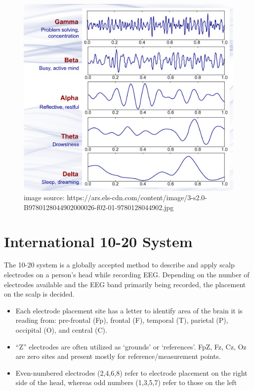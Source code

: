 \documentclass[
  letterpaper,
  DIV=11,
  numbers=noendperiod]{scrreprt}
\begin{document}
\begin{figure}[H]

{\centering \includegraphics[width=1\textwidth,height=\textheight]{images/3-s2.0-B9780128044902000026-f02-01-9780128044902.jpg}

}

\caption{image source:
https://ars.els-cdn.com/content/image/3-s2.0-B9780128044902000026-f02-01-9780128044902.jpg}

\end{figure}%

\section{International 10-20 System}\label{international-10-20-system}

The 10-20 system is a globally accepted method to describe and apply
scalp electrodes on a person's head while recording EEG. Depending on
the number of electrodes available and the EEG band primarily being
recorded, the placement on the scalp is decided.

\begin{itemize}
\item
  Each electrode placement site has a letter to identify area of the
  brain it is reading from: pre-frontal (Fp), frontal (F), temporal (T),
  parietal (P), occipital (O), and central (C).
\item
  ``Z'' electrodes are often utilized as `grounds' or `references'. FpZ,
  Fz, Cz, Oz are zero sites and present mostly for reference/measurement
  points.
\item
  Even-numbered electrodes (2,4,6,8) refer to electrode placement on the
  right side of the head, whereas odd numbers (1,3,5,7) refer to those
  on the left
\end{itemize}
\end{document}
